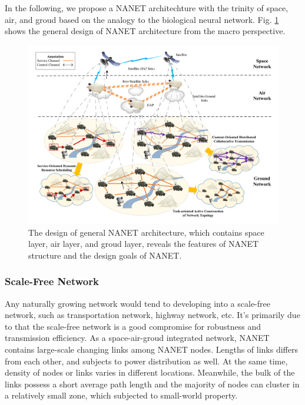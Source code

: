 \documentclass[journal,comsoc]{IEEEtran}
\begin{document}
			In the following, we propose a NANET architechture with the trinity of space, air, and groud based on the analogy to the biological neural network.
			Fig. \ref{fig: sys_frame} shows the general design of NANET architecture from the macro perspective.
			\begin{figure}[htbp]
				\centering
				\includegraphics[width=\linewidth]{figures/Net_Arc.pdf}
				\caption{The design of general NANET architecture, which contains space layer, air layer, and groud layer, reveals the features of NANET structure and the design goals of NANET.}	
				\label{fig: sys_frame}
			\end{figure}
			\subsubsection{Scale-Free Network}
				Any naturally growing network would tend to developing into a scale-free network, such as transportation network, highway network, etc. 
				It's primarily due to that the scale-free network is a good compromise for robustness and transmission efficiency.
				As a space-air-groud integrated network, NANET contains large-scale changing links among NANET nodes.
				Lengths of links differs from each other, and subjects to power distribution as well. 
				At the same time, density of nodes or links varies in different locations.
				Meanwhile, the bulk of the links possess a short average path length and the majority of nodes can cluster in a relatively small zone, which subjected to small-world property.
				
\end{document}
